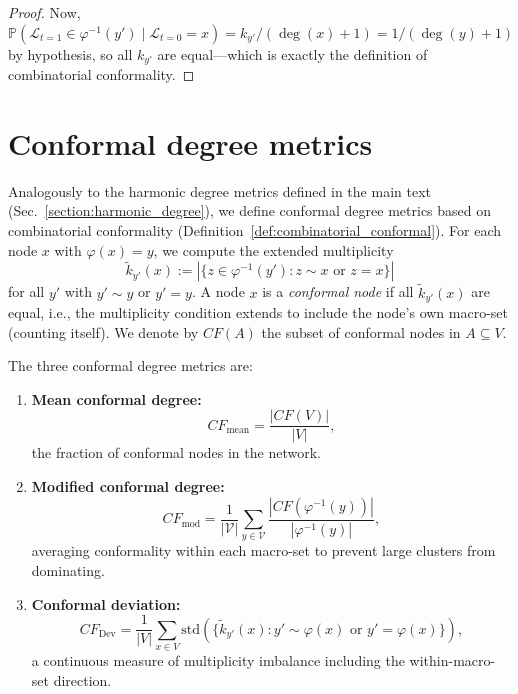\documentclass[twocolumn,superscriptaddress,tightenlines,aps,prx,floatfix]{revtex4-2}
\begin{document}
\begin{bibunit}
\begin{proof}
Now, $\mathbb{P}(\mathcal{L}_{t=1} \in \varphi^{-1}(y') \mid \mathcal{L}_{t=0} = x) = k_{y'}/(\deg(x)+1) = 1/(\deg(y)+1)$ by hypothesis, so all $k_{y'}$ are equal---which is exactly the definition of combinatorial conformality.
\end{proof}

\section{Conformal degree metrics}
\label{sec:conformal_metrics_sm}

Analogously to the harmonic degree metrics defined in the main text (Sec.~\ref*{section:harmonic_degree}), we define conformal degree metrics based on combinatorial conformality (Definition~\ref*{def:combinatorial_conformal}). For each node $x$ with $\varphi(x)=y$, we compute the extended multiplicity
\begin{equation}
\tilde{k}_{y'}(x) := |\{ z \in \varphi^{-1}(y') : z \sim x \text{ or } z = x \}|
\end{equation}
for all $y'$ with $y' \sim y$ or $y' = y$. A node $x$ is a \emph{conformal node} if all $\tilde{k}_{y'}(x)$ are equal, i.e., the multiplicity condition extends to include the node's own macro-set (counting itself). We denote by $CF(A)$ the subset of conformal nodes in $A \subseteq V$.

The three conformal degree metrics are:
\begin{enumerate}
\item \textbf{Mean conformal degree:}
\begin{equation}
CF_{\text{mean}} = \frac{|CF(V)|}{|V|},
\end{equation}
the fraction of conformal nodes in the network.

\item \textbf{Modified conformal degree:}
\begin{equation}
CF_{\text{mod}} = \frac{1}{|\mathcal{V}|}\sum_{y \in \mathcal{V}} \frac{|CF(\varphi^{-1}(y))|}{|\varphi^{-1}(y)|},
\end{equation}
averaging conformality within each macro-set to prevent large clusters from dominating.

\item \textbf{Conformal deviation:}
\begin{equation}
CF_{\text{Dev}} = \frac{1}{|V|}\sum_{x \in V} \mathrm{std}\!\left(\{\tilde{k}_{y'}(x) : y' \sim \varphi(x) \text{ or } y' = \varphi(x)\}\right),
\end{equation}
a continuous measure of multiplicity imbalance including the within-macro-set direction.
\end{enumerate}


\end{bibunit}
\end{document}
